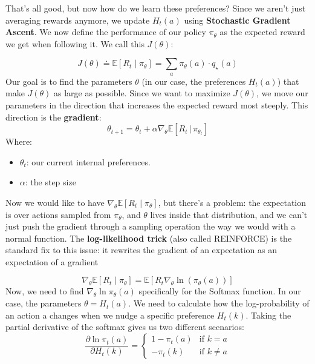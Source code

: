 \begin{tcolorbox}[colframe=black, coltitle=white, title=Function Approximation Primers, fonttitle=\bfseries]
    That's all good, but now how do we learn these preferences? Since we aren't just averaging rewards anymore, we update $H_t(a)$ using \textbf{Stochastic Gradient Ascent}. We now define the performance of our policy $\pi_\theta$ as the expected reward we get when following it. We call this $J(\theta)$: 

\[
    J(\theta) \doteq \mathbb{E}[R_t \mid \pi_\theta] = \sum_a \pi_\theta(a) \cdot q_\star(a)
\]
Our goal is to find the parameters $\theta$ (in our case, the preferences $H_t(a)$) that make $J(\theta)$ as large as possible. Since we want to maximize $J(\theta)$, we move our parameters in the direction that increases the expected reward most steeply. This direction is the \textbf{gradient}:
\[
    \theta_{t+1} = \theta_t + \alpha \nabla_\theta \mathbb{E}[R_t \, | \, \pi_{\theta_t}]
\]
Where:
\begin{itemize}
    \item $\theta_t$: our current internal preferences.
    \item $\alpha$: the step size
\end{itemize}

Now we would like to have $\nabla_\theta \mathbb{E}[R_t \mid\pi_\theta]$, but there's a problem: the expectation is over actions sampled from $\pi_\theta$, and $\theta$ lives inside that distribution, and we can't just push the gradient through a sampling operation the way we would with a normal function. The \textbf{log-likelihood trick} (also called REINFORCE) is the standard fix to this issue: it rewrites the gradient of an expectation as an expectation of a gradient

\[
    \nabla_\theta \mathbb{E}[R_t \mid \pi_\theta] = \mathbb{E}[R_t \nabla_\theta \ln (\pi_\theta(a))]
\]
Now, we need to find $\nabla_\theta \ln \pi_\theta(a)$ specifically for the Softmax function. In our case, the parameters $\theta = H_t(a)$. We need to calculate how the log-probability of an action a changes when we nudge a specific preference $H_t(k)$. Taking the partial derivative of the softmax gives us two different scenarios:
\begin{equation}
    \frac{\partial \ln \pi_t(a)}{\partial H_t(k)} = 
    \begin{cases} 
        1 - \pi_t(a) & \text{if } k = a \\
        -\pi_t(k)    & \text{if } k \neq a 
    \end{cases}
\end{equation}


\end{tcolorbox}
